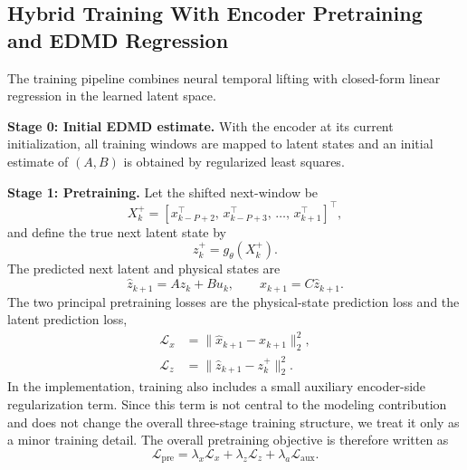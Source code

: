 \documentclass[journal]{IEEEtran}
\begin{document}
\subsection{Hybrid Training With Encoder Pretraining and EDMD Regression}

The training pipeline combines neural temporal lifting with closed-form linear regression in the learned latent space.

\textbf{Stage 0: Initial EDMD estimate.} With the encoder at its current initialization, all training windows are mapped to latent states and an initial estimate of $(A,B)$ is obtained by regularized least squares.

\textbf{Stage 1: Pretraining.} Let the shifted next-window be
\begin{equation}
    X_k^{+} = [x_{k-P+2}^\top,\,x_{k-P+3}^\top,\,\ldots,\,x_{k+1}^\top]^\top,
\end{equation}
and define the true next latent state by
\begin{equation}
    z_k^{+} = g_\theta(X_k^{+}).
\end{equation}
The predicted next latent and physical states are
\begin{equation}
    \hat{z}_{k+1} = Az_k + Bu_k,
    \qquad
    \hat{x}_{k+1} = C\hat{z}_{k+1}.
\end{equation}
The two principal pretraining losses are the physical-state prediction loss and the latent prediction loss,
\begin{align}
    \mathcal{L}_{x} &= \|\hat{x}_{k+1}-x_{k+1}\|_2^2,
    \\
    \mathcal{L}_{z} &= \|\hat{z}_{k+1}-z_k^{+}\|_2^2.
\end{align}
In the implementation, training also includes a small auxiliary encoder-side regularization term. Since this term is not central to the modeling contribution and does not change the overall three-stage training structure, we treat it only as a minor training detail. The overall pretraining objective is therefore written as
\begin{equation}
    \mathcal{L}_{\mathrm{pre}} = \lambda_x\mathcal{L}_x + \lambda_z\mathcal{L}_z + \lambda_a\mathcal{L}_{\mathrm{aux}}.
    \label{eq:pretraining_loss}
\end{equation}
\end{document}
